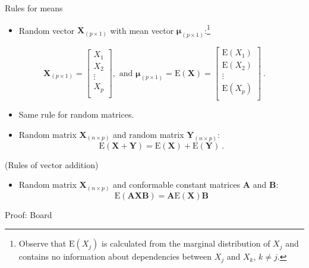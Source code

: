 \documentclass[
  ignorenonframetext,
]{beamer}
\providecommand{\tightlist}{%
  \setlength{\itemsep}{0pt}\setlength{\parskip}{0pt}}
\begin{document}
\begin{frame}
\begin{block}{Rules for means}
\protect\hypertarget{rules-for-means}{}
\(~\)

\begin{itemize}
\tightlist
\item
  Random vector \(\boldsymbol{X}_{(p\times 1)}\) with mean vector
  \(\boldsymbol{\mu}_{(p\times 1)}\):\footnote{Observe that $\text{E}(X_j)$ is calculated from the marginal distribution of $X_j$ and contains no information about dependencies between $X_{j}$ and $X_k$, $k\neq j$.}
\end{itemize}

\[\boldsymbol{X}_{(p\times 1)}=\left[ \begin{array}{c}X_1\\ X_2\\ \vdots\\ X_p\\ \end{array}\right], \text{ and }\boldsymbol{\mu}_{(p \times 1)}=\text{E}(\boldsymbol{X})=\left[ \begin{array}{c}\text{E}(X_1)\\ \text{E}(X_2)\\ \vdots\\ \text{E}(X_p)\\ \end{array}\right] \ .\]

\begin{itemize}
\tightlist
\item
  Same rule for random matrices.
\end{itemize}

\vspace{2mm}

\begin{itemize}
\tightlist
\item
  Random matrix \(\boldsymbol{X}_{(n\times p)}\) and random matrix
  \(\boldsymbol{Y}_{(n\times p)}\):
  \[\text{E}(\boldsymbol{X}+\boldsymbol{Y})=\text{E}(\boldsymbol{X})+\text{E}(\boldsymbol{Y}) \ .\]
\end{itemize}

(Rules of vector addition)
\end{block}
\end{frame}

\begin{frame}
\begin{itemize}
\tightlist
\item
  Random matrix \(\boldsymbol{X}_{(n\times p)}\) and conformable
  constant matrices \(\boldsymbol{A}\) and \(\boldsymbol{B}\):
  \[\text{E}(\boldsymbol{A}\boldsymbol{X}\boldsymbol{B})=\boldsymbol{A}\text{E}(\boldsymbol{X})\boldsymbol{B}\]
\end{itemize}

Proof: Board

\vspace{60mm}
\end{frame}
\end{document}
